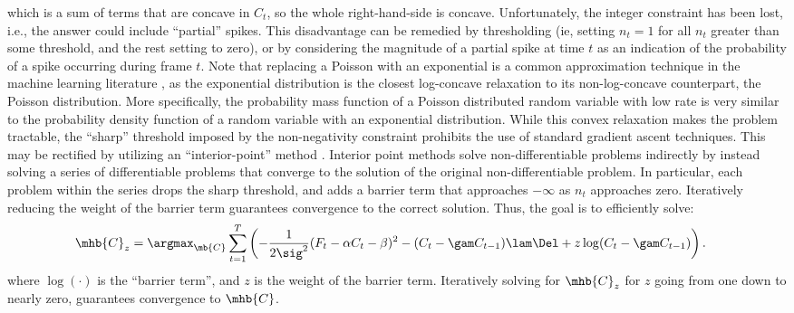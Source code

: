 \noindent which is a sum of terms that are concave in $C_t$, so the whole right-hand-side is concave. Unfortunately, the integer constraint has been lost, i.e.,  the answer could include ``partial'' spikes.  This disadvantage can be remedied by thresholding (ie, setting $n_t=1$ for all $n_t$ greater than some threshold, and the rest setting to zero), or by considering the magnitude of a partial spike at time $t$ as an indication of the probability of a spike occurring during frame $t$. Note that replacing a Poisson with an exponential is a common approximation technique in the machine learning literature \cite{CONV04, PaninskiWu09}, as the exponential distribution is the closest log-concave relaxation to its non-log-concave counterpart, the Poisson distribution. More specifically, the probability mass function of a Poisson distributed random variable with low rate is very similar to the probability density function of a random variable with an exponential distribution. While this convex relaxation makes the problem tractable, the ``sharp'' threshold imposed by the non-negativity constraint prohibits the use of standard gradient ascent techniques. This may be rectified by utilizing an ``interior-point'' method  \cite{CONV04}.  Interior point methods solve non-differentiable problems indirectly by instead solving a series of differentiable problems that converge to the solution of the original non-differentiable problem.  In particular, each problem within the series drops the sharp threshold, and adds a barrier term that approaches $-\infty$ as $n_t$ approaches zero. Iteratively reducing the weight of the barrier term guarantees convergence to the correct solution.  Thus, the goal is to efficiently solve:
\begin{align} \label{eq:eta}
\mhb{C}_{\zzz} &= \argmax_{\mb{C}}  \sum_{t=1}^T \left( -\frac{1}{2 \sig^2}(F_t - \alpha C_t - \beta)^2  -  (C_t-\gam C_{t-1})  \lam \Del + \zzz \log (C_t-\gam C_{t-1}) \right).
\end{align}
\noindent where $\log (\cdot)$ is the ``barrier term'', and $z$ is the weight of the barrier term.  Iteratively solving for $\mhb{C}_{\zzz}$ for $z$ going from one down to nearly zero, guarantees convergence to $\mhb{C}$. %
